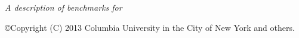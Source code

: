 \documentclass[10pt,twoside,openright]{memoir}
\begin{document}
\pagestyle{headings}
\let\cleardoublepage\clearpage
\maketitle
\frontmatter

\null\vfill

\begin{flushleft}
\textit{A description of benchmarks for \TF}


\copyright{Copyright (C) 2013 Columbia University in the City of New York and others.}












\end{flushleft}
\let\cleardoublepage\clearpage

\newpage
\tableofcontents*
\mainmatter
\sloppy











\end{document}
